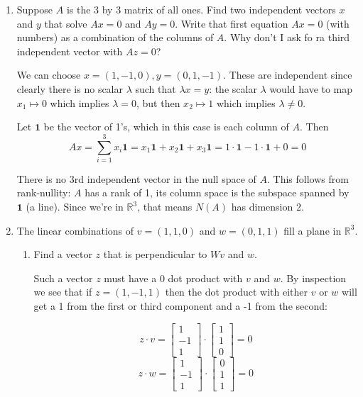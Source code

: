 \documentclass{scrartcl}
\newcommand{\R}{\mathbb{R}}
\begin{document}
\begin{enumerate}
\item Suppose $A$ is the 3 by 3 matrix of all ones. Find two independent vectors $x$ and $y$ that solve $Ax = 0$ and $Ay = 0$. Write that first equation $Ax = 0$ (with numbers) as a combination of the columns of $A$. Why don't I ask fo ra third independent vector with $Az = 0$?

We can choose $x = (1, -1, 0), y = (0, 1, -1)$. These are independent since clearly there is no scalar $\lambda$ such that $\lambda x = y$: the scalar $\lambda $ would have to map $x_1 \mapsto 0$ which implies $\lambda = 0$, but then $x_2 \mapsto 1$ which implies $\lambda \neq 0$. 

Let $\mathbf{1}$ be the vector of 1's, which in this case is each column of $A$. Then
$$Ax = \sum_{i=1}^3 x_i \mathbf{1} = x_1 \mathbf{1} + x_2 \mathbf{1} + x_3\mathbf{1} = 1\cdot \mathbf{1} - 1\cdot\mathbf{1} + 0 = 0$$

There is no 3rd independent vector in the null space of $A$. This follows from rank-nullity: $A$ has a rank of 1, its column space is the subspace spanned by $\mathbf{1}$ (a line). Since we're in $\R^3$, that means $N(A)$ has dimension 2.

\item The linear combinations of $v =(1, 1, 0)$ and $w = (0, 1, 1)$ fill a plane in $\R^3$.
\begin{enumerate}
	\item Find a vector $z$ that is perpendicular to $Wv$ and $w$. 

Such a vector $z$ must have a 0 dot product with $v$ and $w$. By inspection we see that if $z = (1, -1, 1)$ then the dot product with either $v$ or $w$ will get a 1 from the first or third component and a -1 from the second:

$$z \cdot v = \begin{bmatrix}
	1 \\ -1 \\ 1
\end{bmatrix}\cdot
\begin{bmatrix}
	1 \\ 1 \\0
\end{bmatrix} = 0$$
$$z \cdot w = \begin{bmatrix}
	1 \\ -1 \\ 1
\end{bmatrix}\cdot
\begin{bmatrix}
	0 \\ 1 \\ 1
\end{bmatrix} = 0$$


\end{enumerate}
\end{enumerate}
\end{document}

